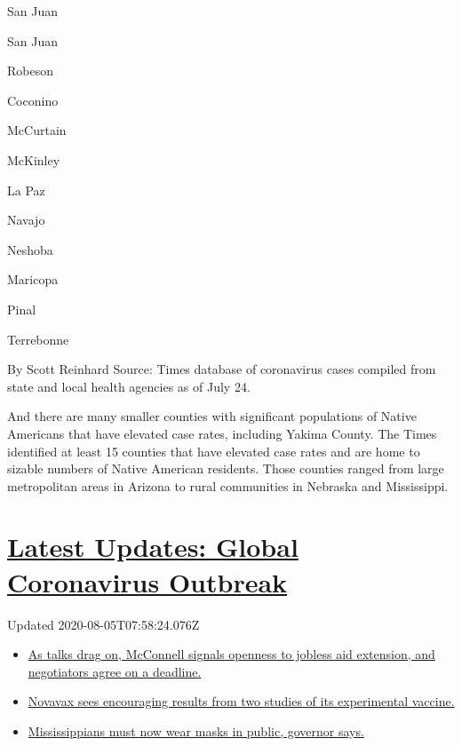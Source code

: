 San Juan

San Juan

Robeson

Coconino

McCurtain

McKinley

La Paz

Navajo

Neshoba

Maricopa

Pinal

Terrebonne

By Scott Reinhard \textbar{} Source: Times database of coronavirus cases
compiled from state and local health agencies as of July 24.

And there are many smaller counties with significant populations of
Native Americans that have elevated case rates, including Yakima County.
The Times identified at least 15 counties that have elevated case rates
and are home to sizable numbers of Native American residents. Those
counties ranged from large metropolitan areas in Arizona to rural
communities in Nebraska and Mississippi.

\hypertarget{latest-updates-global-coronavirus-outbreak}{%
\section{\texorpdfstring{\href{https://www.nytimes3xbfgragh.onion/2020/08/04/world/coronavirus-cases.html?action=click\&pgtype=Article\&state=default\&region=MAIN_CONTENT_1\&context=storylines_live_updates}{Latest
Updates: Global Coronavirus
Outbreak}}{Latest Updates: Global Coronavirus Outbreak}}\label{latest-updates-global-coronavirus-outbreak}}

Updated 2020-08-05T07:58:24.076Z

\begin{itemize}
\tightlist
\item
  \href{https://www.nytimes3xbfgragh.onion/2020/08/04/world/coronavirus-cases.html?action=click\&pgtype=Article\&state=default\&region=MAIN_CONTENT_1\&context=storylines_live_updates\#link-762df92}{As
  talks drag on, McConnell signals openness to jobless aid extension,
  and negotiators agree on a deadline.}
\item
  \href{https://www.nytimes3xbfgragh.onion/2020/08/04/world/coronavirus-cases.html?action=click\&pgtype=Article\&state=default\&region=MAIN_CONTENT_1\&context=storylines_live_updates\#link-1228a480}{Novavax
  sees encouraging results from two studies of its experimental
  vaccine.}
\item
  \href{https://www.nytimes3xbfgragh.onion/2020/08/04/world/coronavirus-cases.html?action=click\&pgtype=Article\&state=default\&region=MAIN_CONTENT_1\&context=storylines_live_updates\#link-794484ed}{Mississippians
  must now wear masks in public, governor says.}
\end{itemize}

